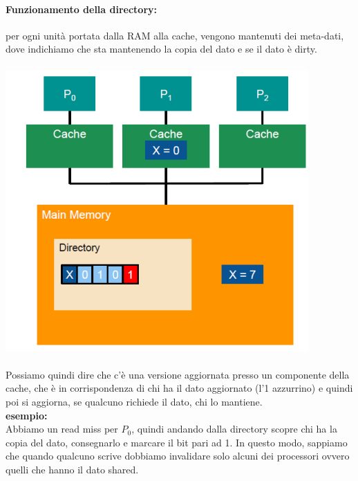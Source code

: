 \documentclass[14pt, oneside]{book}
\begin{document}
\paragraph{Funzionamento della directory:}per ogni unità portata dalla RAM alla cache, vengono mantenuti dei meta-dati, dove indichiamo che sta mantenendo la copia del dato e se il dato è dirty.\\\\
\includegraphics[scale=0.5]{immagini/dir_based}\\\\
Possiamo quindi dire che c'è una versione aggiornata presso un componente della cache, che è in corrispondenza di chi ha il dato aggiornato (l'1 azzurrino) e quindi poi si aggiorna, se qualcuno richiede il dato, chi lo mantiene.\\ \textbf{esempio:}\\ Abbiamo un read miss per $P_0$, quindi andando dalla directory scopre chi ha la copia del dato, consegnarlo e marcare il bit pari ad 1. In questo modo, sappiamo che quando qualcuno scrive dobbiamo invalidare solo alcuni dei processori ovvero quelli che hanno il dato shared.
\end{document}
